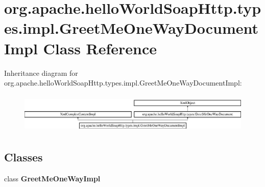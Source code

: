 \hypertarget{classorg_1_1apache_1_1hello_world_soap_http_1_1types_1_1impl_1_1_greet_me_one_way_document_impl}{}\section{org.\+apache.\+hello\+World\+Soap\+Http.\+types.\+impl.\+Greet\+Me\+One\+Way\+Document\+Impl Class Reference}
\label{classorg_1_1apache_1_1hello_world_soap_http_1_1types_1_1impl_1_1_greet_me_one_way_document_impl}
Inheritance diagram for org.\+apache.\+hello\+World\+Soap\+Http.\+types.\+impl.\+Greet\+Me\+One\+Way\+Document\+Impl\+:\begin{figure}[H]
\begin{center}
\leavevmode
\includegraphics[height=1.909091cm]{classorg_1_1apache_1_1hello_world_soap_http_1_1types_1_1impl_1_1_greet_me_one_way_document_impl}
\end{center}
\end{figure}
\subsection*{Classes}
\begin{DoxyCompactItemize}
\item 
class {\bfseries Greet\+Me\+One\+Way\+Impl}
\end{DoxyCompactItemize}
